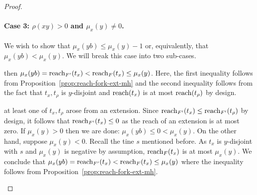 \begin{proof}
\begin{description}[font=\normalfont\itshape\space]
    \end{description}



  \paragraph{Case 3: $\rho(xy)>0$ and $\mu_x(y)\neq0$.}
    We wish to show that $\mu_x(yb) \leq \mu_x(y) - 1$ 
    or, equivalently, that $\mu_x(yb) < \mu_x(y)$. 
    We will break this case into two sub-cases. 
    \begin{description}[font=\normalfont\itshape\space]
      \item[If both $t_\rho, t_x \in F$,] 
      then $\mu_x(yb) = \operatorname{reach}_{F'}(t_x) < \operatorname{reach}_{F}(t_x) \leq \mu_x(y)$. 
      Here, the first inequality follows from Proposition~\ref{prop:reach-fork-ext-mh} 
      and the second inequality follows from the fact that 
      $t_x, t_\rho$ is $y$-disjoint and 
      $\operatorname{reach}(t_x)$ is at most $\operatorname{reach}(t_\rho)$ by design.

      \item[Otherwise,] 
      at least one of $t_x, t_\rho$ arose from an extension. 
      Since $\operatorname{reach}_{F'}(t_x) \leq \operatorname{reach}_{F'}(t_\rho)$ by design, 
      it follows that $\operatorname{reach}_{F'}(t_x) \leq 0$ 
      as the reach of an extension is at most zero.
      If $\mu_x(y) > 0$ then we are done: $\mu_x(yb) \leq 0 < \mu_x(y)$.  
      On the other hand, suppose $\mu_x(y) < 0$. 
      Recall the tine $s$ mentioned before.
      As $t_x$ is $y$-disjoint with $s$ and 
      $\mu_x(y)$ is negative by assumption, 
      $\operatorname{reach}_F(t_x)$ is at most $\mu_x(y)$. 
      We conclude that 
      $
      \mu_x(yb) = \operatorname{reach}_{F'}(t_x) 
      < \operatorname{reach}_F(t_x) 
      \leq \mu_x(y)
      $ 
      where the inequality follows from Proposition~\ref{prop:reach-fork-ext-mh}.




\end{description}
\end{proof}
